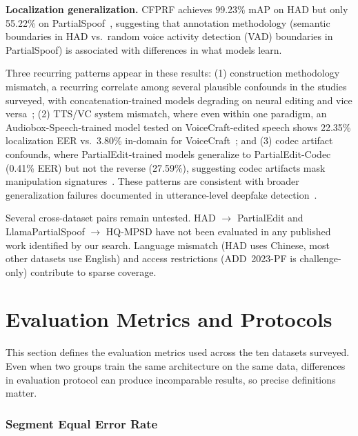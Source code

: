 \documentclass[journal]{IEEEtran}
\begin{document}
\textbf{Localization generalization.} CFPRF achieves 99.23\% mAP on HAD but only 55.22\% on PartialSpoof~\cite{wu2024cfprf}, suggesting that annotation methodology (semantic boundaries in HAD vs.\ random voice activity detection (VAD) boundaries in PartialSpoof) is associated with differences in what models learn.

Three recurring patterns appear in these results: (1) construction methodology mismatch, a recurring correlate among several plausible confounds in the studies surveyed, with concatenation-trained models degrading on neural editing and vice versa~\cite{zhang2025partialedit}; (2) TTS/VC system mismatch, where even within one paradigm, an Audiobox-Speech-trained model tested on VoiceCraft-edited speech shows 22.35\% localization EER vs.\ 3.80\% in-domain for VoiceCraft~\cite{zhang2025partialedit}; and (3) codec artifact confounds, where PartialEdit-trained models generalize to PartialEdit-Codec (0.41\% EER) but not the reverse (27.59\%), suggesting codec artifacts mask manipulation signatures~\cite{zhang2025partialedit}. These patterns are consistent with broader generalization failures documented in utterance-level deepfake detection~\cite{muller2022does}.

Several cross-dataset pairs remain untested. HAD $\rightarrow$ PartialEdit and LlamaPartialSpoof $\rightarrow$ HQ-MPSD have not been evaluated in any published work identified by our search. Language mismatch (HAD uses Chinese, most other datasets use English) and access restrictions (ADD~2023-PF is challenge-only) contribute to sparse coverage.


\section{Evaluation Metrics and Protocols}
\label{sec:metrics}

This section defines the evaluation metrics used across the ten datasets surveyed. Even when two groups train the same architecture on the same data, differences in evaluation protocol can produce incomparable results, so precise definitions matter.



\subsubsection{Segment Equal Error Rate}
\label{sec:seg_eer}
\end{document}

